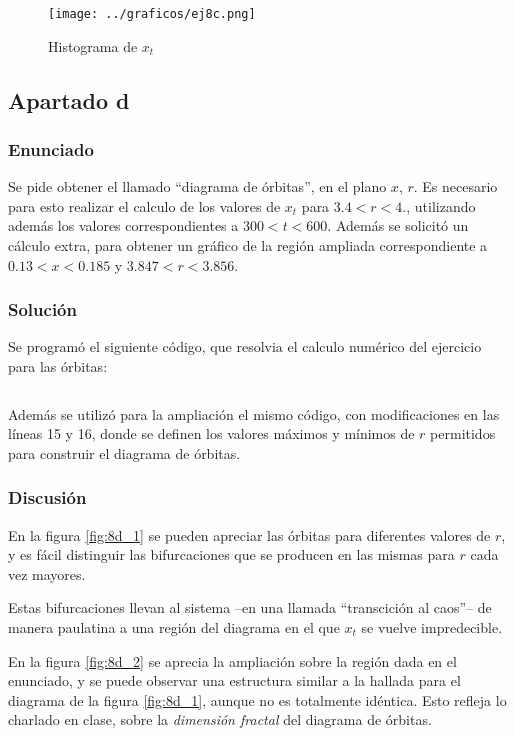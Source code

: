 \documentclass[a4paper,10pt]{paper}
\begin{document}
\begin{figure}[!h]
 \centering
 \texttt{[image: ../graficos/ej8c.png]}
 \caption{Histograma de $x_t$}
 \label{fig:8c}
\end{figure}

\subsection{Apartado d}
\subsubsection{Enunciado}
Se pide obtener el llamado ``diagrama de \'orbitas'', en el plano $x$, $r$. Es necesario para esto realizar el calculo de los valores de 
$x_t$ para $3.4 < r < 4.$, utilizando adem\'as los valores correspondientes a $300 < t < 600$. Adem\'as se solicit\'o un c\'alculo extra, para
obtener un gr\'afico de la regi\'on ampliada correspondiente a $0.13 < x < 0.185$ y $3.847 < r < 3.856$.

\subsubsection{Soluci\'on}
Se program\'o el siguiente c\'odigo, que resolvia el calculo num\'erico del ejercicio para las \'orbitas:
\inputminted[firstline=16, linenos, firstnumber=1]{fortran}{../8/ej8d.f90}

Adem\'as se utiliz\'o para la ampliaci\'on el mismo c\'odigo, con modificaciones en las l\'{i}neas 15 y 16, donde
se definen los valores m\'aximos y m\'{i}nimos de $r$ permitidos para construir el diagrama de \'orbitas.

\subsubsection{Discusi\'on}
En la figura \ref{fig:8d_1} se pueden apreciar las \'orbitas para diferentes valores de $r$, 
y es f\'acil distinguir las bifurcaciones que se producen en las mismas para $r$ cada vez mayores.

Estas bifurcaciones llevan al sistema --en una llamada ``transcici\'on al caos''-- de manera paulatina
a una regi\'on del diagrama en el que $x_t$ se vuelve impredecible.

En la figura \ref{fig:8d_2} se aprecia la ampliaci\'on sobre la regi\'on dada en el enunciado, 
y se puede observar una estructura similar a la hallada para el diagrama de la figura \ref{fig:8d_1}, 
aunque no es totalmente id\'entica. Esto refleja lo charlado en clase, sobre la \textit{dimensi\'on fractal}
del diagrama de \'orbitas.
\end{document}
